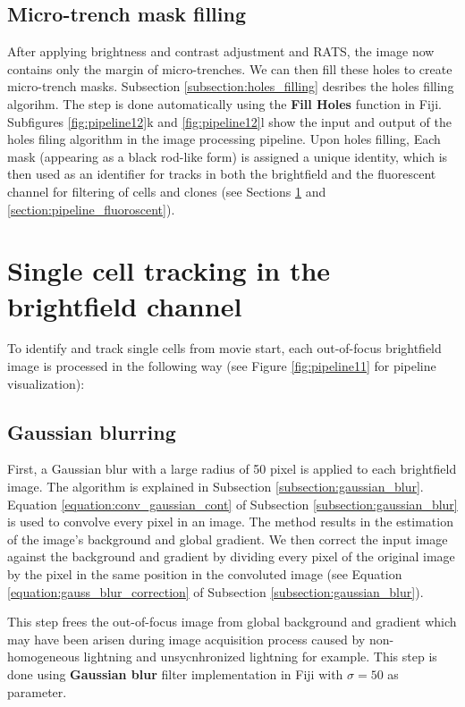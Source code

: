\documentclass[pdftex,12pt,a4paper]{report}
\begin{document}
\subsection{Micro-trench mask filling}

After applying brightness and contrast adjustment and RATS, the image now contains only the margin of micro-trenches. We can then fill these holes to create micro-trench masks. Subsection \ref{subsection:holes_filling} desribes the holes filling algorihm. The step is done automatically using the \textbf{Fill Holes} function in Fiji. Subfigures \ref{fig:pipeline12}k and \ref{fig:pipeline12}l show the input and output of the holes filing algorithm in the image processing pipeline. Upon holes filling, Each mask (appearing as a black rod-like form) is assigned a unique identity, which is then used as an identifier for tracks in both the brightfield and the fluorescent channel for filtering of cells and clones (see Sections \ref{section:pipeline_brightfield} and \ref{section:pipeline_fluoroscent}).

\section{Single cell tracking in the brightfield channel}
\label{section:pipeline_brightfield}

To identify and track single cells from movie start, each out-of-focus brightfield image is processed in the following way (see Figure \ref{fig:pipeline11} for pipeline visualization): 

\subsection{Gaussian blurring}

First, a Gaussian blur  with a large radius of 50 pixel is applied to each brightfield image. The algorithm is explained in Subsection \ref{subsection:gaussian_blur}. Equation \ref{equation:conv_gaussian_cont} of Subsection \ref{subsection:gaussian_blur} is used to convolve every pixel in an image. The method results in the estimation of the image's background and global gradient. We then correct the input image against the background and gradient by dividing every pixel of the original image by the pixel in the same position in the convoluted image (see Equation \ref{equation:gauss_blur_correction} of Subsection \ref{subsection:gaussian_blur}).

This step frees the out-of-focus image from global background and gradient which may have been arisen during image acquisition process caused by non-homogeneous lightning and unsycnhronized lightning for example. This step is done using \textbf{Gaussian blur} filter implementation in Fiji with $\sigma = 50$ as parameter.
\end{document}
